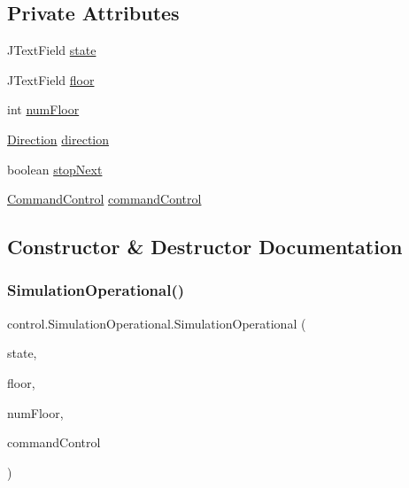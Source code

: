 \subsection*{Private Attributes}
\begin{DoxyCompactItemize}
\item 
J\+Text\+Field \mbox{\hyperlink{classcontrol_1_1_simulation_operational_a0bc5bcb8d7007bfcca3cf0e204dfce5f}{state}}
\item 
J\+Text\+Field \mbox{\hyperlink{classcontrol_1_1_simulation_operational_ad41ae86e7cedc53680f57db31321c34f}{floor}}
\item 
int \mbox{\hyperlink{classcontrol_1_1_simulation_operational_a8b244e8cd89afb3060e4025c76f3ccc1}{num\+Floor}}
\item 
\mbox{\hyperlink{enumcontrol_1_1command_1_1_direction}{Direction}} \mbox{\hyperlink{classcontrol_1_1_simulation_operational_acd8854111b611282faba5ff24d894b53}{direction}}
\item 
boolean \mbox{\hyperlink{classcontrol_1_1_simulation_operational_acda8346b0a85916ca536b13bcb704b33}{stop\+Next}}
\item 
\mbox{\hyperlink{interfacecontrol_1_1_command_control}{Command\+Control}} \mbox{\hyperlink{classcontrol_1_1_simulation_operational_a381628f543ab9b586023f718af9a279d}{command\+Control}}
\end{DoxyCompactItemize}


\subsection{Constructor \& Destructor Documentation}
\mbox{\label{classcontrol_1_1_simulation_operational_a05ea4626f887de31e4c40b3ff2e52162}} 
\subsubsection{\texorpdfstring{SimulationOperational()}{SimulationOperational()}}
{\footnotesize\ttfamily control.\+Simulation\+Operational.\+Simulation\+Operational (\begin{DoxyParamCaption}\item[{J\+Text\+Field}]{state,  }\item[{J\+Text\+Field}]{floor,  }\item[{int}]{num\+Floor,  }\item[{\mbox{\hyperlink{interfacecontrol_1_1_command_control}{Command\+Control}}}]{command\+Control }\end{DoxyParamCaption})}



